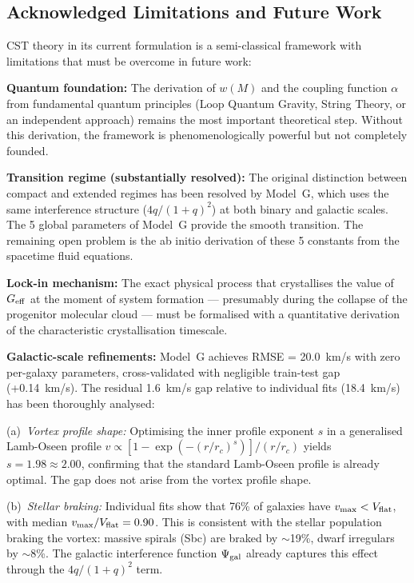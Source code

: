 \documentclass[10pt,a4paper]{article}
\begin{document}
\subsection{Acknowledged Limitations and Future
Work}\label{acknowledged-limitations-and-future-work}

CST theory in its current formulation is a semi-classical framework with
limitations that must be overcome in future work:

\textbf{Quantum foundation:} The derivation of \(w(M)\) and the coupling
function \(\alpha\) from fundamental quantum principles (Loop Quantum
Gravity, String Theory, or an independent approach) remains the most
important theoretical step. Without this derivation, the framework is
phenomenologically powerful but not completely founded.

\textbf{Transition regime (substantially resolved):} The original distinction between compact and extended regimes has been resolved by Model~G, which uses the same interference structure (\(4q/(1+q)^2\)) at both binary and galactic scales. The 5 global parameters of Model~G provide the smooth transition. The remaining open problem is the ab initio derivation of these 5 constants from the spacetime fluid equations.

\textbf{Lock-in mechanism:} The exact physical process that crystallises
the value of \(G_{\rm eff}\) at the moment of system formation ---
presumably during the collapse of the progenitor molecular cloud ---
must be formalised with a quantitative derivation of the characteristic
crystallisation timescale.

\textbf{Galactic-scale refinements:} Model~G achieves RMSE = 20.0~km/s with zero per-galaxy parameters, cross-validated with negligible train-test gap (+0.14~km/s). The residual 1.6~km/s gap relative to individual fits (18.4~km/s) has been thoroughly analysed:

(a)~\textit{Vortex profile shape:} Optimising the inner profile exponent $s$ in a generalised Lamb-Oseen profile $v \propto [1 - \exp(-(r/r_c)^s)] / (r/r_c)$ yields $s = 1.98 \approx 2.00$, confirming that the standard Lamb-Oseen profile is already optimal. The gap does not arise from the vortex profile shape.

(b)~\textit{Stellar braking:} Individual fits show that 76\% of galaxies have $v_{\rm max} < V_{\rm flat}$, with median $v_{\rm max}/V_{\rm flat} = 0.90$. This is consistent with the stellar population braking the vortex: massive spirals (Sbc) are braked by $\sim$19\%, dwarf irregulars by $\sim$8\%. The galactic interference function $\Psi_{\rm gal}$ already captures this effect through the $4q/(1+q)^2$ term.
\end{document}
